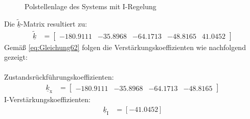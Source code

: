 \begin{figure}[H]
    \centering
    \caption[Polstellenlage I-Regelung]{Polstellenlage des Systems mit I-Regelung}
    \label{fig:Bild12}
\end{figure}

Die $\underline{\tilde{k}}$-Matrix resultiert zu:
\begin{align}\label{eq:Gleichung68}
    \underline{\tilde{k}} &= 
    \begin{bmatrix}
        -180.9111 & -35.8968 & -64.1713 & -48.8165 & 41.0452
    \end{bmatrix}
\end{align}
\newline
Gemäß \autoref{eq:Gleichung62} folgen die Verstärkungskoeffizienten wie nachfolgend gezeigt:\\\\
Zustandsrückführungskoeffizienten:
\begin{align}\label{eq:Gleichung69}
    \underline{k}_{\mathrm{x}} &= 
    \begin{bmatrix}
        -180.9111 & -35.8968 & -64.1713 & -48.8165
    \end{bmatrix}
\end{align}
\newline
I-Verstärkungskoeffizienten:
\begin{align}\label{eq:Gleichung70}
    \underline{k}_{\mathrm{I}} &= [-41.0452]
\end{align}